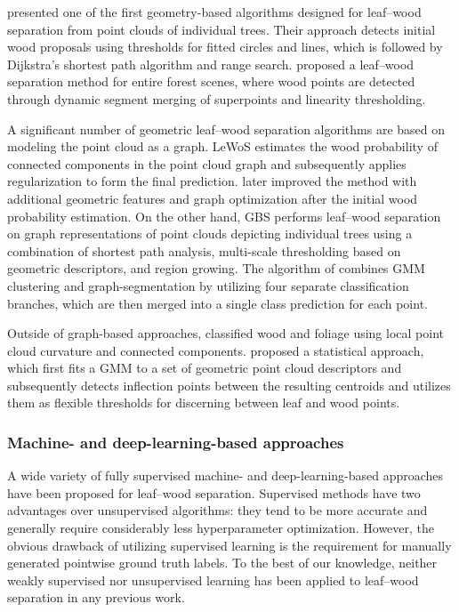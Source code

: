 \cite{tao2015geometric} presented one of the first geometry-based algorithms designed for leaf--wood separation from point clouds of individual trees. Their approach detects initial wood proposals using thresholds for fitted circles and lines, which is followed by Dijkstra's shortest path algorithm and range search. \cite{wang2018separating} proposed a leaf--wood separation method for entire forest scenes, where wood points are detected through dynamic segment merging of superpoints and linearity thresholding.

A significant number of geometric leaf--wood separation algorithms are based on modeling the point cloud as a graph. LeWoS \citep{wang2020lewos} estimates the wood probability of connected components in the point cloud graph and subsequently applies regularization to form the final prediction. \cite{wang2020unsupervised} later improved the method with additional geometric features and graph optimization after the initial wood probability estimation. On the other hand, GBS \citep{tian2022graph} performs leaf--wood separation on graph representations of point clouds depicting individual trees using a combination of shortest path analysis, multi-scale thresholding based on geometric descriptors, and region growing. The algorithm of \cite{vicari2019leaf} combines GMM clustering and graph-segmentation by utilizing four separate classification branches, which are then merged into a single class prediction for each point.

Outside of graph-based approaches, \cite{wan2021novel} classified wood and foliage using local point cloud curvature and connected components. \cite{shcherbcheva2023unsupervised} proposed a statistical approach, which first fits a GMM to a set of geometric point cloud descriptors and subsequently detects inflection points between the resulting centroids and utilizes them as flexible thresholds for discerning between leaf and wood points.

\subsubsection{Machine- and deep-learning-based approaches}

A wide variety of fully supervised machine- and deep-learning-based approaches have been proposed for leaf--wood separation. Supervised methods have two advantages over unsupervised algorithms: they tend to be more accurate \citep[see e.g.][]{morel2020segmentation,jiang2023lwsnet} and generally require considerably less hyperparameter optimization. However, the obvious drawback of utilizing supervised learning is the requirement for manually generated pointwise ground truth labels. To the best of our knowledge, neither weakly supervised nor unsupervised learning has been applied to leaf--wood separation in any previous work.

